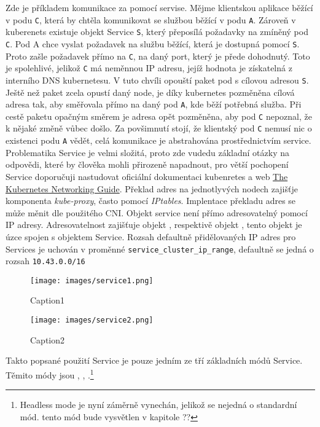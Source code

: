 Zde je příkladem komunikace za pomocí servise. Mějme klientskou aplikace běžící v podu \verb|C|, která by chtěla komunikovat se službou běžící v podu \verb|A|. Zároveň v kuberenets existuje objekt Service \verb|S|, který přeposílá požadavky na zmíněný pod \verb|C|. Pod A chce vyslat požadavek na službu běžící, která je dostupná pomocí \verb|S|. Proto zašle požadavek přímo na \verb|C|, na daný port, který je přede dohodnutý. Toto je spolehlivé, jelikož \verb|C| má neměnnou IP adresu, jejíž hodnota je získatelná z interního DNS kubernetesu. V tuto chvíli opouští paket pod s cílovou adresou \verb|S|. Ještě než paket zcela opustí daný node, je díky kubernetes pozměněna cílová adresa tak, aby směřovala přímo na daný pod \verb|A|, kde běží potřebná služba. Při cestě paketu opačným směrem je adresa opět pozměněna, aby pod \verb|C| nepoznal, že k nějaké změně vůbec došlo. Za povšimnutí stojí, že klientský pod \verb|C| nemusí nic o existenci podu \verb|A| vědět, celá komunikace je abstrahována prostřednictvím service. Problematika Service je velmi složitá, proto zde vudedu základní otázky na odpovědi, které by člověka mohli přirozeně napadnout, pro větší pochopení Service doporučuji nastudovat oficiální dokumentaci kubenretes a web \href{https://www.tkng.io/}{The Kubernetes Networking Guide}. Překlad adres na jednotlyvých nodech zajišťje komponenta \textit{kube-proxy}, často pomocí \textit{IPtables}. Implentace překladu adres se může měnit dle použitého CNI. Objekt service není přímo adresovatelný pomocí IP adresy. Adresovatelnost zajišťuje objekt , respektivě objekt , tento objekt je úzce spojen s objektem Service. Rozsah defaultně přidělovaných IP adres pro Services je uchován v  proměnné \verb|service_cluster_ip_range|, defaultně se jedná o rozsah \verb|10.43.0.0/16|\cite{a2023_rancher}



\begin{figure}[!ht]
    \centering
    \texttt{[image: images/service1.png]}
    \caption{Caption1}
    \label{fig:service1}
\end{figure}
\begin{figure}[!ht]
    \centering
    \texttt{[image: images/service2.png]}
    \caption{Caption2}
    \label{fig:service2}
\end{figure}

Takto popsané použití Service je pouze jedním ze tří základních módů Service. Těmito módy jsou , , .\footnote{Headless mode je nyní záměrně vynechán, jelikož se nejedná o standardní mód. tento mód bude vysvětlen v kapitole ??} 

